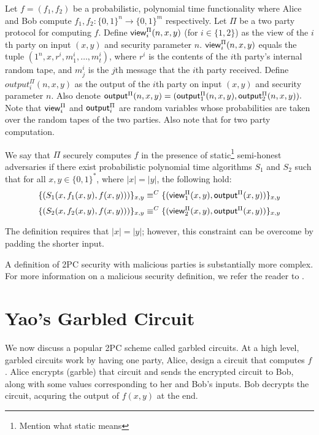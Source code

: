 \begin{definition}
Let $f = (f_1, f_2)$ be a probabilistic, polynomial time functionality where Alice and Bob compute $f_1, f_2: \{0,1\}^n \to \{0,1\}^m$ respectively.
Let $\Pi$ be a two party protocol for computing $f$. 
Define ${\sf view}_i^{\Pi}(n,x,y)$ (for $i \in \{1,2\}$) as the view of the $i$th party on input $(x,y)$ and security parameter $n$.
${\sf view}_i^{\Pi}(n,x,y)$ equals the tuple $(1^n, x, r^i, m_1^i, \ldots, m_t^i)$, where $r^i$ is the contents of the $i$th party's internal random tape, and $m_j^i$ is the $j$th message that the $i$th party received.
Define $output^{\Pi}_i(n,x,y)$ as the output of the $i$th party on input $(x,y)$ and security parameter $n$.
Also denote $ {\sf output}^{\Pi}(n,x,y) = ({\sf output}^{\Pi}_1(n,x,y), {\sf output}^{\Pi}_2(n,x,y)).$
Note that ${\sf view}^{\Pi}_i$ and ${\sf output}^{\Pi}_i$ are random variables whose probabilities are taken over the random tapes of the two parties. Also note that for two party computation.

We say that $\Pi$ securely computes $f$ in the presence of static\footnote{ Mention what static means} semi-honest adversaries if there exist probabilistic polynomial time algorithms $S_1$ and $S_2$ such that for all $x,y \in \{0,1\}^*$, where $|x| = |y|$, the following hold:
\begin{equation} 
    \label{eqn:secdef1}
    \{(S_1(x, f_1(x,y), f(x,y)))\}_{x,y} \equiv^C \{({\sf view}^{\Pi}_1(x,y), {\sf output}^{\Pi}(x,y)) \}_{x,y} 
\end{equation}
\begin{equation} 
    \label{eqn:secdef2}
    \{(S_2(x, f_2(x,y), f(x,y)))\}_{x,y} \equiv^C \{({\sf view}^{\Pi}_2(x,y), {\sf output}^{\Pi}(x,y)) \}_{x,y} 
\end{equation}
\end{definition}

The definition requires that $|x| = |y|$; however, this constraint can be overcome by padding the shorter input.

A definition of 2PC security with malicious parties is substantially more complex.
For more information on a malicious security definition, we refer the reader to \cite{lindell2009}.

\section{Yao's Garbled Circuit}
We now discuss a popular 2PC scheme called garbled circuits.
At a high level, garbled circuits work by having one party, Alice, design a circuit that computes $f$.
Alice encrypts (garble) that circuit and sends the encrypted circuit to Bob, along with some values corresponding to her and Bob's inputs.
Bob decrypts the circuit, acquring the output of $f(x,y)$ at the end.

